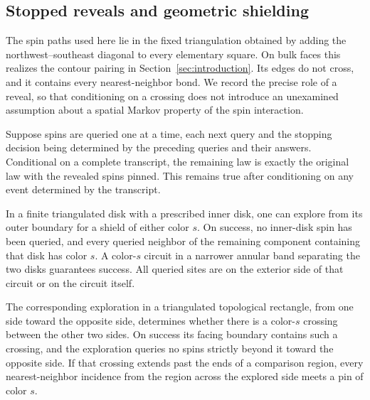 \subsection{Stopped reveals and geometric shielding}

The spin paths used here lie in the fixed triangulation obtained by
adding the northwest--southeast diagonal to every elementary square.
On bulk faces this realizes the contour pairing in
Section~\ref{sec:introduction}.  Its edges do not cross, and it contains
every nearest-neighbor bond.  We record the precise role of a reveal, so
that conditioning on a crossing does not introduce an unexamined
assumption about a spatial Markov property of the spin interaction.

\begin{lemma}
\label{lem:comparison-stopped-reveal}
Suppose spins are queried one at a time, each next query and the stopping
decision being determined by the preceding queries and their answers.
Conditional on a complete transcript, the remaining law is exactly the
original law with the revealed spins pinned.  This remains true after
conditioning on any event determined by the transcript.

In a finite triangulated disk with a prescribed inner disk, one can
explore from its outer boundary for a shield of either color \(s\).
On success, no inner-disk spin has been queried, and every queried
neighbor of the remaining component containing that disk has color
\(s\).  A color-\(s\) circuit in a narrower annular band separating the
two disks guarantees success.  All queried sites are on the exterior
side of that circuit or on the circuit itself.

The corresponding exploration in a triangulated topological rectangle,
from one side toward the opposite side, determines whether there is a
color-\(s\) crossing between the other two sides.  On success its facing
boundary contains such a crossing, and the exploration queries no spins
strictly beyond it toward the opposite side.  If that crossing extends
past the ends of a comparison region, every nearest-neighbor incidence
from the region across the explored side meets a pin of color \(s\).
\end{lemma}

